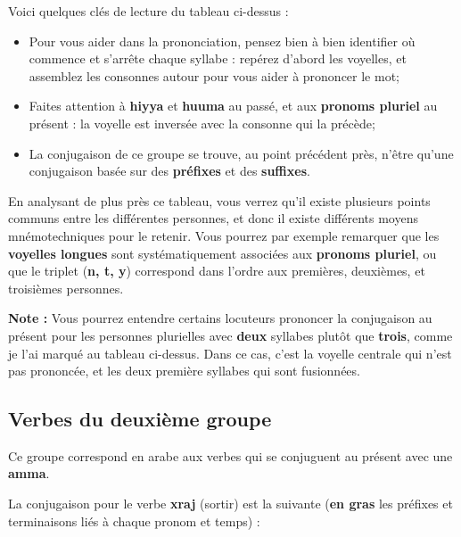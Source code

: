 Voici quelques clés de lecture du tableau ci-dessus :

\begin{itemize}
    \item Pour vous aider dans la prononciation, pensez bien à bien identifier où commence et s'arrête chaque syllabe : repérez d'abord les voyelles, et assemblez les consonnes autour pour vous aider à prononcer le mot;
    \item Faites attention à \textbf{hiyya} et \textbf{huuma} au passé, et aux \textbf{pronoms pluriel} au présent : la voyelle est inversée avec la consonne qui la précède;
    \item La conjugaison de ce groupe se trouve, au point précédent près, n'être qu'une conjugaison basée sur des \textbf{préfixes} et des \textbf{suffixes}.
\end{itemize}

En analysant de plus près ce tableau, vous verrez qu'il existe plusieurs points communs entre les différentes personnes, et donc il existe différents moyens mnémotechniques pour le retenir. Vous pourrez par exemple remarquer que les \textbf{voyelles longues} sont systématiquement associées aux \textbf{pronoms pluriel}, ou que le triplet (\textbf{n, t, y}) correspond dans l'ordre aux premières, deuxièmes, et troisièmes personnes.

\textbf{Note :} Vous pourrez entendre certains locuteurs prononcer la conjugaison au présent pour les personnes plurielles avec \textbf{deux} syllabes plutôt que \textbf{trois}, comme je l'ai marqué au tableau ci-dessus. Dans ce cas, c'est la voyelle centrale qui n'est pas prononcée, et les deux première syllabes qui sont fusionnées.

\subsection{Verbes du deuxième groupe}
Ce groupe correspond en arabe aux verbes qui se conjuguent au présent avec une \textbf{\dh amma}.

La conjugaison pour le verbe \textbf{xraj} (sortir) est la suivante (\textbf{en gras} les préfixes et terminaisons liés à chaque pronom et temps) :

